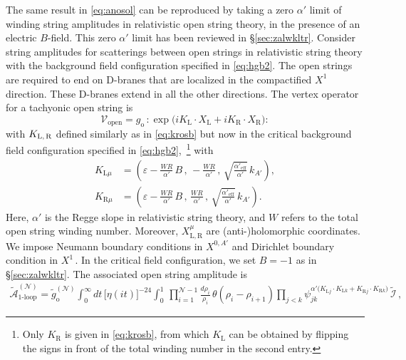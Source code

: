 \documentclass[11pt]{article}
\newcommand{\be}{\begin{equation}}
\newcommand{\ee}{\end{equation}}
\newcommand{\CA}{\mathcal{A}}
\newcommand{\CI}{\mathcal{I}}
\newcommand{\CN}{\mathcal{N}}
\newcommand{\CV}{\mathcal{V}}
\newcommand{\lr}{\left (}
\newcommand{\rr}{\right )}
\renewcommand{\tilde}[1]{\widetilde{#1}}
\begin{document}
The same result in \eqref{eq:anosol} can be reproduced by taking a zero $\alpha'$ limit of winding string amplitudes in relativistic open string theory, in the presence of an electric $B$-field. This zero $\alpha'$ limit has been reviewed in \S\ref{sec:zalwkltr}. Consider string amplitudes for scatterings between open strings in relativistic string theory with the background field configuration specified in \eqref{eq:hgb2}. The open strings are required to end on D-branes that are localized in the compactified $X^1$ direction. These D-branes extend in all the other directions. The vertex operator for a tachyonic open string is
%
\be
    \CV_\text{open} = g_\text{o}\, :\! \exp \bigl( i K_\text{L} \cdot X_\text{L} + i K_\text{R} \cdot X_\text{R} \bigr) \!:
\ee
%
with $K_\text{L,\,R}$ defined similarly as in \eqref{eq:krosb} but now in the critical background field configuration specified in \eqref{eq:hgb2},~\footnote{Only $K_\text{R}$ is given in \eqref{eq:krosb}, from which $K_\text{L}$ can be obtained by flipping the signs in front of the total winding number in the second entry.} with
%
\begin{subequations} \label{eq:klkr22}
\begin{align} 
    K_{\text{L}\mu} & = \lr \varepsilon - \frac{W R}{\alpha'} \, B\,,\, - \frac{W R}{\alpha'}\,,\, \sqrt{\frac{\alpha'_\text{eff}}{\alpha'}} \, k_{A'} \rr, \\[2pt]
    K_{\text{R}\mu} & = \lr \varepsilon - \frac{W R}{\alpha'} \, B\,,\, \frac{WR}{\alpha'}\,,\, \sqrt{\frac{\alpha'_\text{eff}}{\alpha'}} \, k_{A'} \rr.
\end{align}
\end{subequations}
%
Here, $\alpha'$ is the Regge slope in relativistic string theory, and $W$ refers to the total open string winding number. 
Moreover, 
$X^\mu_{\text{L},\,\text{R}}$ are (anti-)holomorphic coordinates. We impose Neumann boundary conditions in $X^{0,A'}$ and Dirichlet boundary condition in $X^1$\,. In the critical field configuration, we set $B = -1$ as in \S\ref{sec:zalwkltr}. The associated open string amplitude is
%
\begin{align} \label{eq:AN1looprel}
    \tilde{\CA}^{(\CN)}_\text{1-loop} = \tilde{g}_\text{o}^{(\CN)} \int_0^\infty \! dt \, \bigl[ \eta(it) \bigr]^{-24} \int_0^1 \, \prod_{i=1}^{\CN-1} \frac{d\rho_i}{\rho_i} \, \theta(\rho_i - \rho_{i+1}) \prod_{j<k} \psi_{jk}^{\alpha' \bigl( K_{\text{L}j} \cdot K_{\text{L}k} + K_{\text{R}j} \cdot K_{\text{R}k} \bigr)} \, \tilde{\CI}\,,
\end{align}
\end{document}
